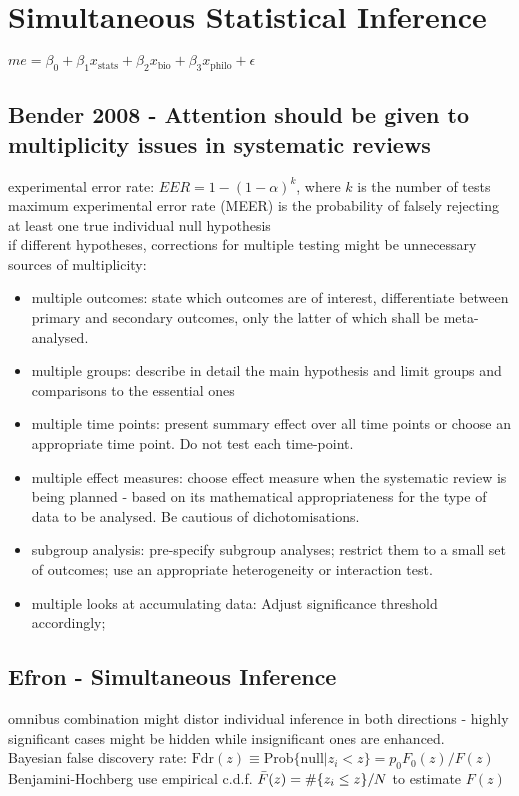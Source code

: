 \chapter{Simultaneous Statistical Inference}

$me = \beta_0 + \beta_1 x_\text{stats} + \beta_2 x_\text{bio} + \beta_3 x_\text{philo} + \epsilon$

\section{Bender 2008 - Attention should be given to multiplicity issues in systematic reviews}
experimental error rate: $EER = 1-(1-\alpha)^k$, where $k$ is the number of tests\\
maximum experimental error rate (MEER) is the probability of falsely rejecting at least one true individual null hypothesis\\
if different hypotheses, corrections for multiple testing might be unnecessary\\
sources of multiplicity: 
\begin{itemize}
    \item multiple outcomes: state which outcomes are of interest, differentiate between primary and secondary outcomes, only the latter of which shall be meta-analysed.
    \item multiple groups: describe in detail the main hypothesis and limit groups and comparisons to the essential ones
    \item multiple time points: present summary effect over all time points or choose an appropriate time point. Do not test each time-point.
    
    \item multiple effect measures: choose effect measure when the systematic review is being planned - based on its mathematical appropriateness for the type of data to be analysed. Be cautious of dichotomisations.
    \item subgroup analysis: pre-specify subgroup analyses; restrict them to a small set of outcomes; use an appropriate heterogeneity or interaction test. 
    \item multiple looks at accumulating data: Adjust significance threshold accordingly; 
\end{itemize}


\section{Efron - Simultaneous Inference}
omnibus combination might distor individual inference in both directions - highly significant cases might be hidden while insignificant ones are enhanced.\\
Bayesian false discovery rate: $\text{Fdr}(z)\equiv \text{Prob\{null|}z_i<z\}=p_0 F_0(z)/F(z)$\\
Benjamini-Hochberg use empirical c.d.f. $\Bar{F}(z)=\#\{z_i \leq z\}/N$ to estimate $F(z)$

